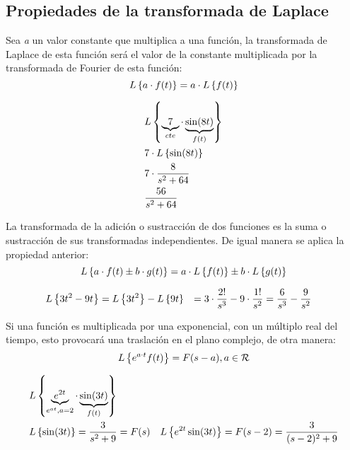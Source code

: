 \documentclass[12pt,fleqn,a4paper,oneside]{LegrandOrangeBook}
\begin{document}
\subsection{Propiedades de la transformada de Laplace}
\begin{theorem}
Sea \textit{a} un valor constante que multiplica a una función, la transformada de Laplace de esta función será el valor de la constante multiplicada por la transformada de Fourier de esta función:
\begin{equation}
L\left\lbrace a\cdot f(t)\right\rbrace=a\cdot L\left\lbrace f(t)\right\rbrace
\end{equation}
\end{theorem}
\begin{example}
\begin{align*}
&L\left\lbrace \underbrace{7}_{cte}\cdot\underbrace{\sin(8t)}_{f(t)}\right\rbrace\\
&7\cdot L\left\lbrace \sin(8t)\right\rbrace\\
&7\cdot\frac{8}{s^2+64}\\
&\frac{56}{s^2+64}
\end{align*}
\end{example}
\begin{theorem}[Linealidad]
La transformada de la adición o sustracción de dos funciones es la suma o sustracción de sus transformadas independientes. De igual manera se aplica la propiedad anterior:
\begin{equation}
L\left\lbrace a\cdot f(t)\pm b\cdot g(t)\right\rbrace=a\cdot L\left\lbrace f(t)\right\rbrace\pm b\cdot L\left\lbrace g(t)\right\rbrace
\end{equation}
\end{theorem}
\begin{example}[Linealidad]
\begin{align*}
L\left\lbrace 3t^2-9t\right\rbrace&=L\left\lbrace 3t^2\right\rbrace-L\left\lbrace 9t\right\rbrace
&=3\cdot\frac{2!}{s^3}-9\cdot\frac{1!}{s^2}
&=\frac{6}{s^3}-\frac{9}{s^2}
\end{align*}
\end{example}
\begin{theorem}[Traslación]
Si una función es multiplicada por una exponencial, con un múltiplo real del tiempo, esto provocará una traslación en el plano complejo, de otra manera:
\begin{equation}
L\left\lbrace e^{a\cdot t}f(t)\right\rbrace=F(s-a), a\in \mathcal{R}
\end{equation}
\end{theorem}
\begin{example}[Traslación]
\begin{align*}
&L\left\lbrace \underbrace{e^{2t}}_{e^{at},a=2}\cdot\underbrace{\sin(3t)}_{f(t)}\right\rbrace\\
&L\left\lbrace \sin(3t)\right\rbrace=\frac{3}{s^2+9}=F(s)
&L\left\lbrace e^{2t}\sin(3t)\right\rbrace=F(s-2)=\frac{3}{(s-2)^2+9}
\end{align*}
\end{example}
\end{document}
